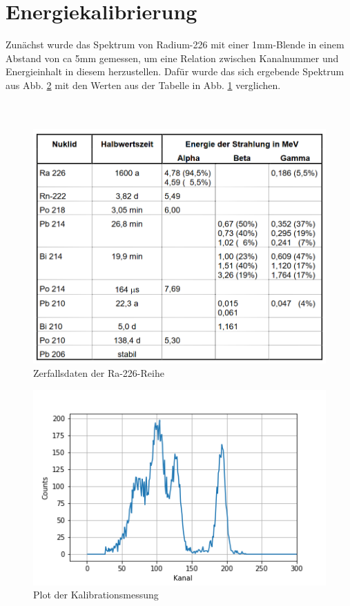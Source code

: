 


\section{Energiekalibrierung}
\label{subs:kali}

Zunächst wurde das Spektrum von Radium-226 mit einer 1mm-Blende in einem Abstand von ca 5mm gemessen, um eine Relation zwischen Kanalnummer 
und Energieinhalt in diesem herzustellen. Dafür wurde das sich ergebende Spektrum aus Abb. \ref{bild:kali} mit den Werten aus der 
Tabelle in Abb. \ref{bild:TabelleRa} verglichen.
\\
\\
\\

\begin{figure}[h]
    \centering
    \includegraphics[scale=0.5]{Bilder/TabelleRadium.png}
    \caption{Zerfallsdaten der Ra-226-Reihe \protect \footnotemark}
    \label{bild:TabelleRa}
\end{figure}

\clearpage

\begin{figure}[h]
    \centering
    \includegraphics[scale=0.75]{Bilder/kali.png}
    \caption{Plot der Kalibrationsmessung} 
    \label{bild:kali}
\end{figure}


